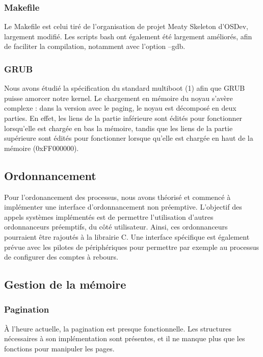 \documentclass[a4paper, 11pt, twoside]{article}
\begin{document}
\subsubsection{Makefile}

Le Makefile est celui tiré de l'organisation de projet Meaty Skeleton d'OSDev,
largement modifié.
Les scripts bash ont également été largement améliorés, afin de faciliter la 
compilation, notamment avec l'option --gdb.

\subsubsection{GRUB}

Nous avons étudié la spécification du standard multiboot (1) afin que GRUB puisse
amorcer notre kernel. Le chargement en mémoire du noyau s'avère complexe : dans la
 version avec le paging, le noyau est décomposé en deux parties. En effet, les liens
 de la partie inférieure sont édités pour fonctionner lorsqu'elle est chargée en bas 
 la mémoire, tandis que les liens de la partie supérieure sont édités pour fonctionner
 lorsque qu'elle est chargée en haut de la mémoire (0xFF000000).

\subsection{Ordonnancement}

Pour l'ordonancement des processus, nous avons théorisé et commencé à
implémenter une interface d'ordonnancement non préemptive. L'objectif des appels
systèmes implémentés est de permettre l'utilisation d'autres ordonnanceurs
préemptifs, du côté utilisateur. Ainsi, ces ordonnanceurs pourraient être
rajoutés à la librairie C.
Une interface spécifique est également prévue avec les pilotes de périphériques
pour permettre par exemple au processus de configurer des comptes à rebours.

\subsection{Gestion de la mémoire}

\subsubsection{Pagination}

À l'heure actuelle, la pagination est presque fonctionnelle. Les structures
nécessaires à son implémentation sont présentes, et il ne manque plus que les
fonctions pour manipuler les pages.
\end{document}
